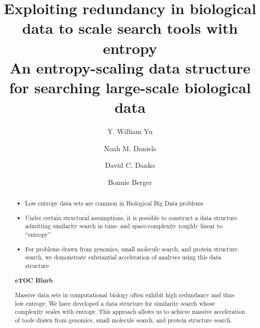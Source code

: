 \documentclass[review,preprint,12pt]{elsarticle}
\theoremstyle{definition}
\theoremstyle{remark}
\numberwithin{equation}{section}
\begin{document}
\begin{frontmatter}

\title{Exploiting redundancy in biological data to scale search tools with entropy \\ An entropy-scaling data structure for searching large-scale biological data}

\author[mitmath,mitcsail]{Y. William Yu}
\author[mitmath,mitcsail]{Noah M. Daniels}
\author[mitcsail]{David C. Danko}
\author[mitmath,mitcsail]{Bonnie Berger}
\address[mitmath]{Department of Mathematics, Massachusetts Institute of Technology, Cambridge, Massachusetts 02139}
\address[mitcsail]{Computer Science and AI Lab, Massachusetts Institute of Technology, Cambridge, Massachusetts 02139}






\begin{abstract}
    \begin{itemize}
        \item Low entropy data sets are common in Biological Big Data problems
        \item Under certain structural assumptions, it is possible to construct a data structure admitting similarity search in time- and space-complexity roughly linear to ``entropy''
        \item For problems drawn from genomics, small molecule search, and protein structure search, we demonstrate substantial acceleration of analyses using this data structure
    \end{itemize}
\noindent\unskip\textbf{eTOC Blurb}
\par\medskip\noindent\unskip\ignorespaces
Massive data sets in computational biology often exhibit high redundancy and thus low entropy.
We have developed a data structure for similarity search whose complexity scales with entropy.
This approach allows us to achieve massive acceleration of tools drawn from genomics, small molecule search, and protein structure search.
\end{abstract}

\end{frontmatter}
\end{document}
